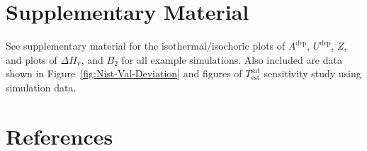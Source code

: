 \documentclass[5p,times]{elsarticle}
\begin{document}
\section{Supplementary Material} \label{sec:SupMat} 
See supplementary material for 
the isothermal/isochoric plots of $A^{\mathrm{dep}}$, $U^{\mathrm{dep}}$, $Z$, and plots of $\Delta H_{\mathrm{v}}$, and $B_2$ for all example simulations. Also included are data shown in Figure~\ref{fig:Nist-Val-Deviation} and figures of $T^\mathrm{sat}_\mathrm{est}$ sensitivity study using simulation data.
\section{References} \label{sec:ref} 



\end{document}
